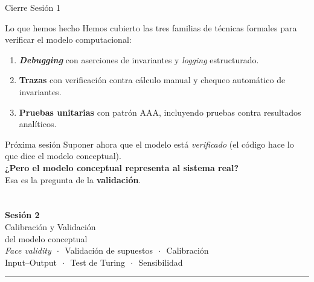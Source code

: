 \documentclass[aspectratio=1610, 10pt]{beamer}
\begin{document}
\begin{frame}{Cierre Sesión 1}
  \begin{block}{Lo que hemos hecho}
    Hemos cubierto las tres familias de técnicas formales para verificar el
    modelo computacional:
  \end{block}

  \vspace{6pt}
  \begin{enumerate}\itemsep2pt
    \item \textbf{\emph{Debugging}} con aserciones de invariantes y
      \emph{logging} estructurado.
    \item \textbf{Trazas} con verificación contra cálculo manual y chequeo
      automático de invariantes.
    \item \textbf{Pruebas unitarias} con patrón AAA, incluyendo pruebas
      contra resultados analíticos.
  \end{enumerate}

  \vspace{6pt}
  \begin{alertblock}{Próxima sesión}
    Suponer ahora que el modelo está \emph{verificado} (el código hace lo que
    dice el modelo conceptual).\\
    \textbf{¿Pero el modelo conceptual representa al sistema real?}\\
    Esa es la pregunta de la \textbf{validación}.
  \end{alertblock}
\end{frame}

\section*{}
\begin{frame}[plain,c]
  \begin{center}
    {\Huge \color{princetonorange}\textbf{Sesión 2}}\\[0.5cm]
    {\Large Calibración y Validación}\\
    {\large del modelo conceptual}\\[0.4cm]
    {\normalsize \emph{Face validity} $\,\cdot\,$ Validación de supuestos
      $\,\cdot\,$ Calibración\\
      Input--Output $\,\cdot\,$ Test de Turing $\,\cdot\,$ Sensibilidad}\\[0.4cm]
    {\color{mobigold}\rule{0.5\textwidth}{1.2pt}}
  \end{center}
\end{frame}
\end{document}
